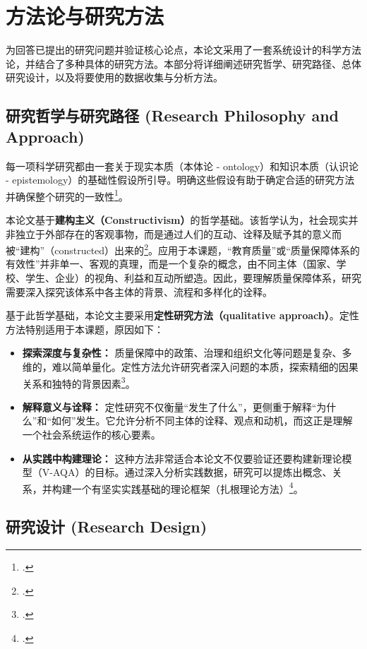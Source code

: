 
\section{方法论与研究方法}
\label{sec:phuong_phap_luan}

为回答已提出的研究问题并验证核心论点，本论文采用了一套系统设计的科学方法论，并结合了多种具体的研究方法。本部分将详细阐述研究哲学、研究路径、总体研究设计，以及将要使用的数据收集与分析方法。

\subsection{研究哲学与研究路径 (Research Philosophy and Approach)}
\label{subsec:triet_ly_tiep_can}

每一项科学研究都由一套关于现实本质（本体论 - ontology）和知识本质（认识论 - epistemology）的基础性假设所引导。明确这些假设有助于确定合适的研究方法并确保整个研究的一致性\footcite{Creswell2018}。

本论文基于\textbf{建构主义（Constructivism）}的哲学基础。该哲学认为，社会现实并非独立于外部存在的客观事物，而是通过人们的互动、诠释及赋予其的意义而被“建构”（constructed）出来的\footcite{GubaLincoln1994}。应用于本课题，“教育质量”或“质量保障体系的有效性”并非单一、客观的真理，而是一个复杂的概念，由不同主体（国家、学校、学生、企业）的视角、利益和互动所塑造。因此，要理解质量保障体系，研究需要深入探究该体系中各主体的背景、流程和多样化的诠释。

基于此哲学基础，本论文主要采用\textbf{定性研究方法（qualitative approach）}。定性方法特别适用于本课题，原因如下：
\begin{itemize}
    \item \textbf{探索深度与复杂性：} 质量保障中的政策、治理和组织文化等问题是复杂、多维的，难以简单量化。定性方法允许研究者深入问题的本质，探索精细的因果关系和独特的背景因素\footcite{Yin2018}。
    \item \textbf{解释意义与诠释：} 定性研究不仅衡量“发生了什么”，更侧重于解释“为什么”和“如何”发生。它允许分析不同主体的诠释、观点和动机，而这正是理解一个社会系统运作的核心要素。
    \item \textbf{从实践中构建理论：} 这种方法非常适合本论文不仅要验证还要构建新理论模型（V-AQA）的目标。通过深入分析实践数据，研究可以提炼出概念、关系，并构建一个有坚实实践基础的理论框架（扎根理论方法）\footcite{Charmaz2006}。
\end{itemize}

\subsection{研究设计 (Research Design)}
\label{subsec:thiet_ke_nghien_cuu}

